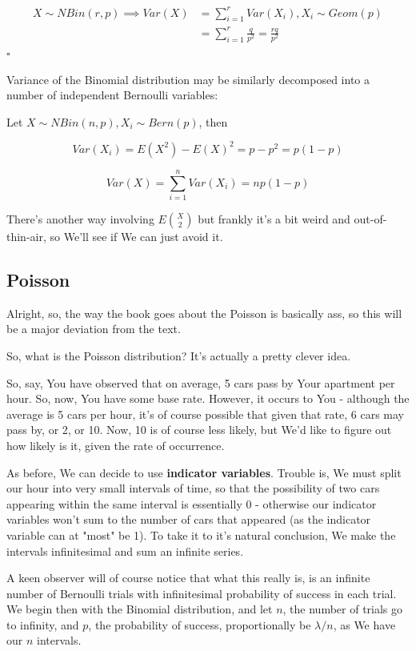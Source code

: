 \documentclass{article}
\newcommand{\qed}{\hfill$\square$}
\begin{document}
		\begin{equation*}
			\begin{split}
				X \sim NBin(r, p) \implies Var(X) &= \sum^r_{i=1} Var(X_i), X_i \sim Geom(p)\\
				& = \sum^r_{i=1} \frac{q}{p^2} = \frac{rq}{p^2}
			\end{split}
		\end{equation*}\qed
		
		Variance of the Binomial distribution may be similarly decomposed into a number of independent Bernoulli variables:
		
		Let $X \sim NBin(n, p), X_i \sim Bern(p)$, then 
		
		\[Var(X_i) = E(X^2) - E(X)^2 = p - p^2 = p(1-p)\]
		
		\[Var(X) = \sum^n_{i=1} Var(X_i) = np(1-p)\]
		
		There's another way involving $E{X \choose 2}$ but frankly it's a bit weird and out-of-thin-air, so We'll see if We can just avoid it.
		
	\subsection{Poisson}
	
		Alright, so, the way the book goes about the Poisson is basically ass, so this will be a major deviation from the text.
		
		So, what is the Poisson distribution? It's actually a pretty clever idea.
		
		So, say, You have observed that on average, 5 cars pass by Your apartment per hour. So, now, You have some base rate. However, it occurs to You - although the average is 5 cars per hour, it's of course possible that given that rate, 6 cars may pass by, or 2, or 10. Now, 10 is of course less likely, but We'd like to figure out how likely is it, given the rate of occurrence.
		
		As before, We can decide to use \textbf{indicator variables}. Trouble is, We must split our hour into very small intervals of time, so that the possibility of two cars appearing within the same interval is essentially 0 - otherwise our indicator variables won't sum to the number of cars that appeared (as the indicator variable can at "most" be 1). To take it to it's natural conclusion, We make the intervals infinitesimal and sum an infinite series.
		
		A keen observer will of course notice that what this really is, is an infinite number of Bernoulli trials with infinitesimal probability of success in each trial. We begin then with the Binomial distribution, and let $n$, the number of trials go to infinity, and $p$, the probability of success, proportionally be $\lambda/n$, as We have our $n$ intervals.
		
\end{document}
